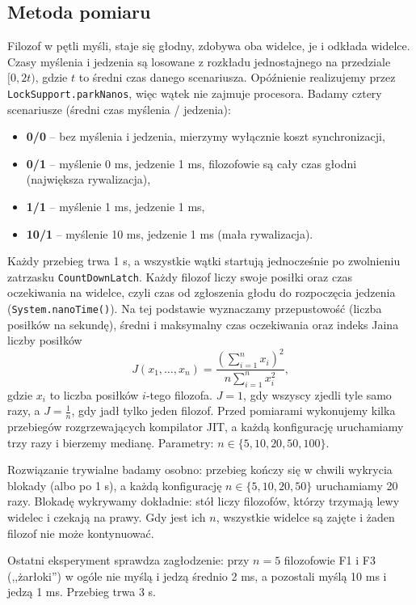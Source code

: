 \documentclass[11pt,a4paper]{article}
\begin{document}
\subsection{Metoda pomiaru}
Filozof w pętli myśli, staje się głodny, zdobywa oba widelce, je i odkłada widelce.
Czasy myślenia i jedzenia są losowane z rozkładu jednostajnego na przedziale $[0, 2t)$,
gdzie $t$ to średni czas danego scenariusza. Opóźnienie realizujemy przez \texttt{LockSupport.parkNanos},
więc wątek nie zajmuje procesora. Badamy cztery scenariusze (średni czas myślenia / jedzenia):
\begin{itemize}
    \item \textbf{0/0} -- bez myślenia i jedzenia, mierzymy wyłącznie koszt synchronizacji,
    \item \textbf{0/1} -- myślenie 0 ms, jedzenie 1 ms, filozofowie są cały czas głodni (największa rywalizacja),
    \item \textbf{1/1} -- myślenie 1 ms, jedzenie 1 ms,
    \item \textbf{10/1} -- myślenie 10 ms, jedzenie 1 ms (mała rywalizacja).
\end{itemize}

Każdy przebieg trwa 1 s, a wszystkie wątki startują jednocześnie po zwolnieniu zatrzasku
\texttt{CountDownLatch}. Każdy filozof liczy swoje posiłki oraz czas oczekiwania na widelce,
czyli czas od zgłoszenia głodu do rozpoczęcia jedzenia (\texttt{System.nanoTime()}).
Na tej podstawie wyznaczamy przepustowość (liczba posiłków na sekundę),
średni i maksymalny czas oczekiwania oraz indeks Jaina liczby posiłków
\[
    J(x_1, \dots, x_n) = \frac{\left(\sum_{i=1}^{n} x_i\right)^2}{n \sum_{i=1}^{n} x_i^2},
\]
gdzie $x_i$ to liczba posiłków $i$-tego filozofa. $J = 1$, gdy wszyscy zjedli tyle samo razy,
a $J = \frac{1}{n}$, gdy jadł tylko jeden filozof. Przed pomiarami wykonujemy kilka przebiegów
rozgrzewających kompilator JIT, a każdą konfigurację uruchamiamy trzy razy i bierzemy medianę.
Parametry: $n \in \{5, 10, 20, 50, 100\}$.

Rozwiązanie trywialne badamy osobno: przebieg kończy się w chwili wykrycia blokady
(albo po 1 s), a każdą konfigurację $n \in \{5, 10, 20, 50\}$ uruchamiamy 20 razy.
Blokadę wykrywamy dokładnie: stół liczy filozofów, którzy trzymają lewy widelec i czekają
na prawy. Gdy jest ich $n$, wszystkie widelce są zajęte i żaden filozof nie może kontynuować.

Ostatni eksperyment sprawdza zagłodzenie: przy $n = 5$ filozofowie F1 i F3 (,,żarłoki'')
w ogóle nie myślą i jedzą średnio 2 ms, a pozostali myślą 10 ms i jedzą 1 ms. Przebieg trwa 3 s.
\end{document}
